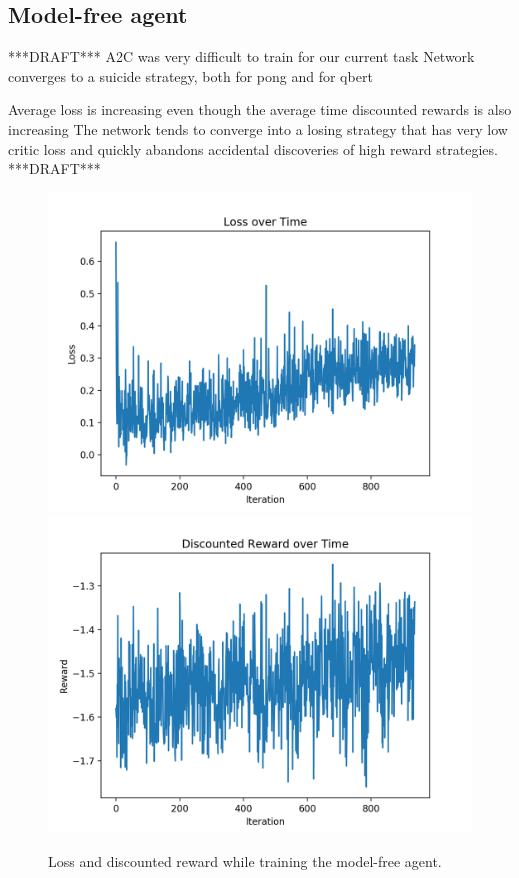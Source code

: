 \documentclass[10pt, twocolumn]{article}
\begin{document}
\subsection{Model-free agent}

***DRAFT***
A2C was very difficult to train for our current task
Network converges to a suicide strategy, both for pong and for qbert

Average loss is increasing even though the average time discounted rewards is also increasing
The network tends to converge into a losing strategy that has very low critic loss and quickly abandons accidental discoveries of high reward strategies.
***DRAFT***


\begin{figure}[h]
\centering
\includegraphics[scale=0.4]{losses}
\includegraphics[scale=0.4]{rewards}
\caption{Loss and discounted reward while training the model-free agent.}
\label{plots}
\end{figure}
\end{document}
